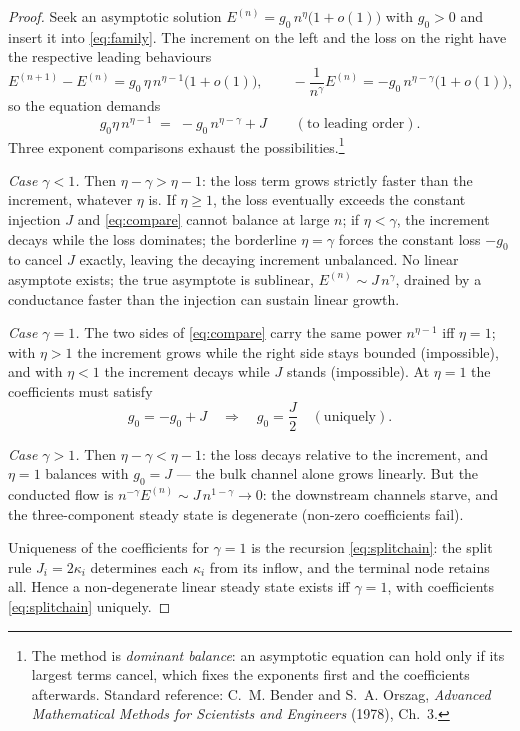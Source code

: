 \documentclass[11pt]{amsbook}
\theoremstyle{plain}
\theoremstyle{definition}
\theoremstyle{remark}
\begin{document}
\begin{proof}
Seek an asymptotic solution $E^{(n)} = g_{0}\, n^{\eta}\bigl(1 + o(1)\bigr)$ with $g_{0} > 0$ and insert it into \cref{eq:family}. The increment on the left and the loss on the right have the respective leading behaviours
\begin{equation}\label{eq:balance}
E^{(n+1)} - E^{(n)} = g_{0}\,\eta\, n^{\eta - 1}\bigl(1 + o(1)\bigr),
\qquad
-\frac{1}{n^{\gamma}}E^{(n)} = -g_{0}\, n^{\eta - \gamma}\bigl(1 + o(1)\bigr),
\end{equation}
so the equation demands
\begin{equation}\label{eq:compare}
g_{0}\eta\, n^{\eta-1} \;=\; -g_{0}\, n^{\eta-\gamma} + J \qquad (\text{to leading order}).
\end{equation}
Three exponent comparisons exhaust the possibilities.\footnote{The method is \emph{dominant balance}: an asymptotic equation can hold only if its largest terms cancel, which fixes the exponents first and the coefficients afterwards. Standard reference: C.~M. Bender and S.~A. Orszag, \emph{Advanced Mathematical Methods for Scientists and Engineers} (1978), Ch.~3.}

\emph{Case $\gamma < 1$.} Then $\eta - \gamma > \eta - 1$: the loss term grows strictly faster than the increment, whatever $\eta$ is. If $\eta \geq 1$, the loss eventually exceeds the constant injection $J$ and \cref{eq:compare} cannot balance at large $n$; if $\eta < \gamma$, the increment decays while the loss dominates; the borderline $\eta = \gamma$ forces the constant loss $-g_{0}$ to cancel $J$ exactly, leaving the decaying increment unbalanced. No linear asymptote exists; the true asymptote is sublinear, $E^{(n)} \sim J\,n^{\gamma}$, drained by a conductance faster than the injection can sustain linear growth.

\emph{Case $\gamma = 1$.} The two sides of \cref{eq:compare} carry the same power $n^{\eta - 1}$ iff $\eta = 1$; with $\eta > 1$ the increment grows while the right side stays bounded (impossible), and with $\eta < 1$ the increment decays while $J$ stands (impossible). At $\eta = 1$ the coefficients must satisfy
\begin{equation}\label{eq:coefficient}
g_{0} = -g_{0} + J \quad\Longrightarrow\quad g_{0} = \frac{J}{2} \quad (\text{uniquely}).
\end{equation}

\emph{Case $\gamma > 1$.} Then $\eta - \gamma < \eta - 1$: the loss decays relative to the increment, and $\eta = 1$ balances with $g_{0} = J$ --- the bulk channel alone grows linearly. But the conducted flow is $n^{-\gamma} E^{(n)} \sim J\, n^{1-\gamma} \to 0$: the downstream channels starve, and the three-component steady state is degenerate (non-zero coefficients fail).

Uniqueness of the coefficients for $\gamma = 1$ is the recursion \cref{eq:splitchain}: the split rule $J_{i} = 2\kappa_{i}$ determines each $\kappa_{i}$ from its inflow, and the terminal node retains all. Hence a non-degenerate linear steady state exists iff $\gamma = 1$, with coefficients \cref{eq:splitchain} uniquely.
\end{proof}
\end{document}
